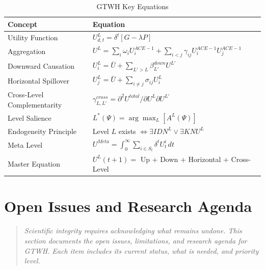 \begin{table}[htbp]
\centering
\caption{GTWH Key Equations}
\label{tab:aaa-key-equations}
\renewcommand{\arraystretch}{1.4}
\small
\begin{tabular}{@{}p{4cm}p{8cm}@{}}
\toprule
\textbf{Concept} & \textbf{Equation} \\
\midrule
Utility Function & $U^L_{d,t} = \delta^t [G - \lambda P]$ \\
Aggregation & $U^L = \sum_i \omega_i U^{ACE-1}_i + \sum_{i<j} \gamma_{ij} U^{ACE-1}_i U^{ACE-1}_j$ \\
Downward Causation & $U^L_i = \bar{U} + \sum_{L'>L} \beta^{down}_{L'} U^{L'}$ \\
Horizontal Spillover & $U^L_j = \bar{U} + \sum_{i \neq j} \sigma_{ij} U^L_i$ \\
Cross-Level Complementarity & $\gamma^{cross}_{L,L'} = \partial^2 U^{total} / \partial U^L \partial U^{L'}$ \\
Level Salience & $L^*(\Psi) = \arg\max_L [A^L(\Psi)]$ \\
Endogeneity Principle & Level $L$ exists $\iff \exists IDN^L \lor \exists KNU^L$ \\
Meta Level & $U^{Meta} = \int_0^\infty \sum_{i \in S_t} \delta^t U^i_t \, dt$ \\
Master Equation & $U^L(t+1) = $ Up + Down + Horizontal + Cross-Level \\
\bottomrule
\end{tabular}
\end{table}



\section{Open Issues and Research Agenda}
\label{sec:aaa-open-issues}

\begin{quote}
\textit{Scientific integrity requires acknowledging what remains undone. This 
section documents the open issues, limitations, and research agenda for GTWH. 
Each item includes its current status, what is needed, and priority level.}
\end{quote}

